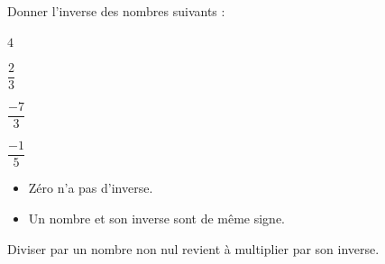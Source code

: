\documentclass[a4paper]{book}
\begin{document}
    \begin{exemple} 
        Donner l'inverse des nombres suivants : 

        \medskip

        \begin{minipage}{0.24\linewidth}
            $4$

            \vspace{0.5cm}
        \end{minipage}
        \hfill\vline\hfill
        \begin{minipage}{0.24\linewidth}
            $\dfrac{2}{3}$

            \vspace{0.5cm}
        \end{minipage}
        \hfill\vline\hfill
        \begin{minipage}{0.24\linewidth}
            $\dfrac{-7}{3}$

            \vspace{0.5cm}
        \end{minipage}
        \hfill\vline\hfill
        \begin{minipage}{0.24\linewidth}
            $\dfrac{-1}{5}$

            \vspace{0.5cm}
        \end{minipage}
    \end{exemple}

    
    \begin{remarque}
        \begin{itemize}
            \item Zéro n'a pas d'inverse.
            \item Un nombre et son inverse sont de même signe.
        \end{itemize}
    \end{remarque}
    
    \begin{propriete} 
        Diviser par un nombre non nul revient à multiplier par son inverse.
    \end{propriete}
      
\end{document}
